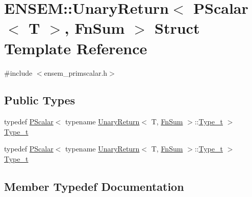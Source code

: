 \hypertarget{structENSEM_1_1UnaryReturn_3_01PScalar_3_01T_01_4_00_01FnSum_01_4}{}\section{E\+N\+S\+EM\+:\+:Unary\+Return$<$ P\+Scalar$<$ T $>$, Fn\+Sum $>$ Struct Template Reference}
\label{structENSEM_1_1UnaryReturn_3_01PScalar_3_01T_01_4_00_01FnSum_01_4}


{\ttfamily \#include $<$ensem\+\_\+primscalar.\+h$>$}

\subsection*{Public Types}
\begin{DoxyCompactItemize}
\item 
typedef \mbox{\hyperlink{classENSEM_1_1PScalar}{P\+Scalar}}$<$ typename \mbox{\hyperlink{structENSEM_1_1UnaryReturn}{Unary\+Return}}$<$ T, \mbox{\hyperlink{structENSEM_1_1FnSum}{Fn\+Sum}} $>$\+::\mbox{\hyperlink{structENSEM_1_1UnaryReturn_3_01PScalar_3_01T_01_4_00_01FnSum_01_4_abc54c8d313930663db099556679c774a}{Type\+\_\+t}} $>$ \mbox{\hyperlink{structENSEM_1_1UnaryReturn_3_01PScalar_3_01T_01_4_00_01FnSum_01_4_abc54c8d313930663db099556679c774a}{Type\+\_\+t}}
\item 
typedef \mbox{\hyperlink{classENSEM_1_1PScalar}{P\+Scalar}}$<$ typename \mbox{\hyperlink{structENSEM_1_1UnaryReturn}{Unary\+Return}}$<$ T, \mbox{\hyperlink{structENSEM_1_1FnSum}{Fn\+Sum}} $>$\+::\mbox{\hyperlink{structENSEM_1_1UnaryReturn_3_01PScalar_3_01T_01_4_00_01FnSum_01_4_abc54c8d313930663db099556679c774a}{Type\+\_\+t}} $>$ \mbox{\hyperlink{structENSEM_1_1UnaryReturn_3_01PScalar_3_01T_01_4_00_01FnSum_01_4_abc54c8d313930663db099556679c774a}{Type\+\_\+t}}
\end{DoxyCompactItemize}


\subsection{Member Typedef Documentation}
\mbox{\label{structENSEM_1_1UnaryReturn_3_01PScalar_3_01T_01_4_00_01FnSum_01_4_abc54c8d313930663db099556679c774a}} 
